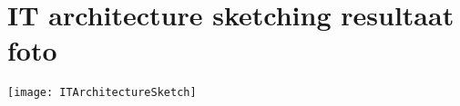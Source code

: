 \chapter{IT architecture sketching resultaat foto}
\label{appendix:ITArchitectureSketch}
\begin{center}
	\begin{graphic}
		\texttt{[image: ITArchitectureSketch]}
	\end{graphic}
\end{center}

